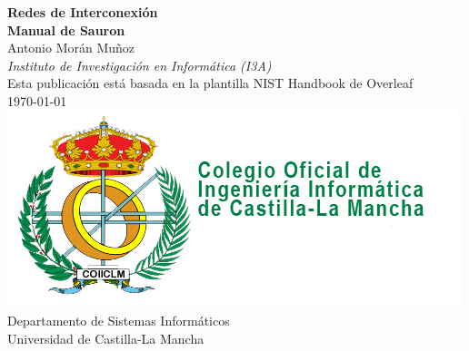 \begin{titlepage}
\begin{flushright}
\LARGE{\textbf{Redes de Interconexión}}\\
\vfill 
\Huge{\textbf{Manual de Sauron}}\\
    \vfill
    \normalsize Antonio Morán Muñoz\\
     \textit{Instituto de Investigación en Informática (I3A)}\\
    \vfill
\normalsize Esta publicación está basada en la plantilla NIST Handbook de Overleaf\\
\vfill
\normalsize \today
\vfill
\includegraphics[width=0.5\linewidth]{figs/logo-cooiiclm.png}\\ 
 \vfill
\footnotesize Departamento de Sistemas Informáticos\\ 
\vspace{10pt}
Universidad de Castilla-La Mancha\\ 
\end{flushright}
\end{titlepage}



